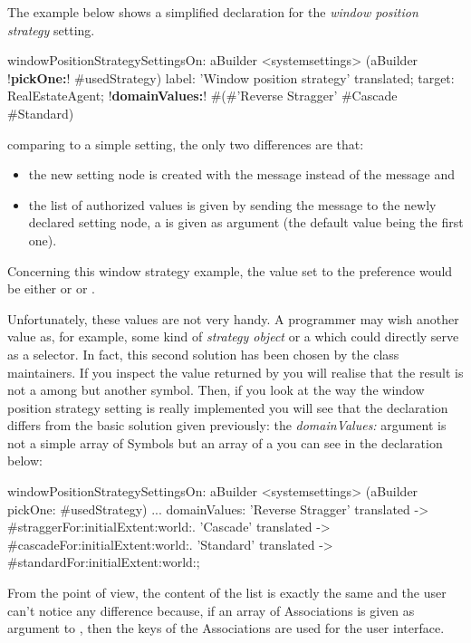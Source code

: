 \documentclass[a4paper,10pt,twoside]{book}
\begin{document}
The example below shows a simplified declaration for the \textit{window position strategy} setting. 
\begin{code}{}
windowPositionStrategySettingsOn: aBuilder
	<systemsettings>
	(aBuilder !\textbf{pickOne:}! #usedStrategy) 
		label: 'Window position strategy' translated;
		target: RealEstateAgent;
		!\textbf{domainValues:}! #(#'Reverse Stragger' #Cascade #Standard)
\end{code}
comparing to a simple setting, the only two differences are that:
\begin{itemize}
\item 
	the new setting node is created with the  message instead of the  message and
\item
	the list of authorized values is given by sending the  message to the newly declared setting node, a  is given as argument (the default value being the first one).
\end{itemize}

Concerning this window strategy example, the value set to the preference would be either  or  or . 

Unfortunately, these values are not very handy. A programmer may wish another value as, for example, some kind of \textit{strategy object} or a  which could directly serve as a selector. In fact, this second solution has been chosen by the  class maintainers.
If you inspect the value returned by  you will realise that the result is not a  among  but another symbol. Then, if you look at the way the window position strategy setting is really implemented you will see that the declaration differs from the basic solution given previously: the \textit{domainValues:} argument is not a simple array of {Symbol}s but an array of  a you can see in the declaration below:

\begin{code}{}
windowPositionStrategySettingsOn: aBuilder
	<systemsettings> 
	(aBuilder pickOne: #usedStrategy)
	...
	domainValues: {'Reverse Stragger' translated -> #straggerFor:initialExtent:world:. 'Cascade' translated -> #cascadeFor:initialExtent:world:. 'Standard' translated -> #standardFor:initialExtent:world:};
\end{code}

From the \setbrowser point of view, the content of the list is exactly the same and the user can't notice any difference because, if an array of Associations is given as argument to , then the keys of the Associations are used for the user interface. 
\end{document}
